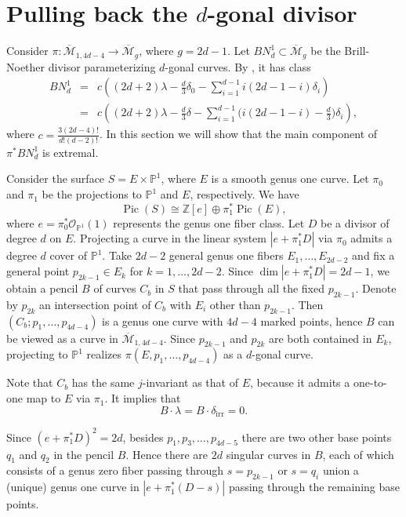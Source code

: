 \documentclass[11]{amsart}
\theoremstyle{plain}
\theoremstyle{definition}
\newcommand{\BM}{\overline{\mathcal M}}
\newcommand{\OO}{\mathcal O}
\newcommand{\irr}{\operatorname{irr}}
\newcommand{\Pic}{\operatorname{Pic}}
\newcommand{\bbP}{\mathbb P}
\newcommand{\bbZ}{\mathbb Z}
\begin{document}
\section{Pulling back the $d$-gonal divisor}
\label{sec:d-gonal}


Consider $\pi: \BM_{1,4d-4} \to \BM_{g}$, where $g = 2d-1$. Let $BN^1_d\subset \BM_g$ be the Brill-Noether divisor parameterizing $d$-gonal curves. 
By \cite{HarrisMumfordKodaira}, it has class 
\begin{eqnarray}
\label{eq:d-gonal}
BN^1_d & = & c \left((2d+2)\lambda - \frac{d}{3}\delta_0 - \sum_{i=1}^{d-1}i (2d-1-i)\delta_i\right) \\ \nonumber 
                & = & c \left((2d+2)\lambda - \frac{d}{3}\delta - \sum_{i=1}^{d-1}  \Big(i (2d-1-i) - \frac{d}{3}\Big)\delta_i \right), 
\end{eqnarray}
where $c = \frac{3(2d-4)!}{d!(d-2)!}$.  In this section we will show that the main component of $\pi^{*}BN^{1}_{d}$ is extremal.

Consider the surface $S = E\times \bbP^1$, where $E$ is a smooth genus one curve. Let $\pi_0$ and $\pi_1$ be the projections to $\bbP^1$ and $E$, respectively. 
We have 
$$ \Pic(S) \cong \bbZ[e] \oplus \pi_1^{*}\Pic(E), $$
where $e = \pi_0^{*} \OO_{\bbP^1}(1)$ represents the genus one fiber class. Let $D$ be a divisor of degree $d$ on $E$. 
Projecting a curve in the linear system $|e + \pi_1^{*}D|$ via $\pi_0$ admits a degree $d$ cover of $\bbP^1$. Take $2d-2$ general genus one fibers $E_1, \ldots, E_{2d-2}$ and fix a general point $p_{2k-1}\in E_k$ for $k=1,\ldots, 2d-2$. 
Since $\dim |e + \pi_1^{*}D| = 2d-1$, we obtain a pencil $B$ of curves $C_b$ in $S$ that pass through all the fixed $p_{2k-1}$. 
Denote by $p_{2k}$ an intersection point of $C_b$ with $E_i$ other than $p_{2k-1}$. Then $(C_b; p_1, \ldots, p_{4d-4})$ 
is a genus one curve with $4d-4$ marked points, hence $B$ can be viewed as a curve in $\BM_{1,4d-4}$. Since $p_{2k-1}$ and $p_{2k}$ are 
both contained in $E_k$, projecting to $\bbP^1$ realizes $\pi(E, p_1,\ldots, p_{4d-4})$ as a $d$-gonal curve. 

Note that $C_b$ has the same $j$-invariant 
as that of $E$, because it admits a one-to-one map to $E$ via $\pi_1$. It implies that 
$$ B\cdot \lambda = B\cdot \delta_{\irr} = 0. $$

Since $(e + \pi_1^{*}D)^2 = 2d$, besides $p_1, p_3, \ldots, p_{4d-5}$ there are two other base points $q_1$ and $q_2$ in the pencil $B$. Hence there are 
$2d$ singular curves in $B$, each of which consists of a genus zero fiber passing through $s = p_{2k-1}$ or $s = q_i$ union a (unique) genus one curve 
in $|e + \pi_1^{*}(D-s)|$ passing through the remaining base points.
\end{document}
